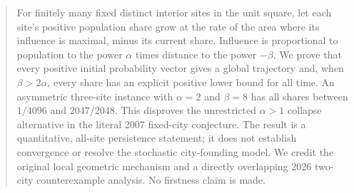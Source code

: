 \begin{abstract}
For finitely many fixed distinct interior sites in the unit square, let each site's positive population share grow at the rate of the area where its influence is maximal, minus its current share. Influence is proportional to population to the power $\alpha$ times distance to the power $-\beta$. We prove that every positive initial probability vector gives a global trajectory and, when $\beta>2\alpha$, every share has an explicit positive lower bound for all time. An asymmetric three-site instance with $\alpha=2$ and $\beta=8$ has all shares between $1/4096$ and $2047/2048$. This disproves the unrestricted $\alpha>1$ collapse alternative in the literal 2007 fixed-city conjecture. The result is a quantitative, all-site persistence statement; it does not establish convergence or resolve the stochastic city-founding model. We credit the original local geometric mechanism and a directly overlapping 2026 two-city counterexample analysis. No firstness claim is made.
\end{abstract}
